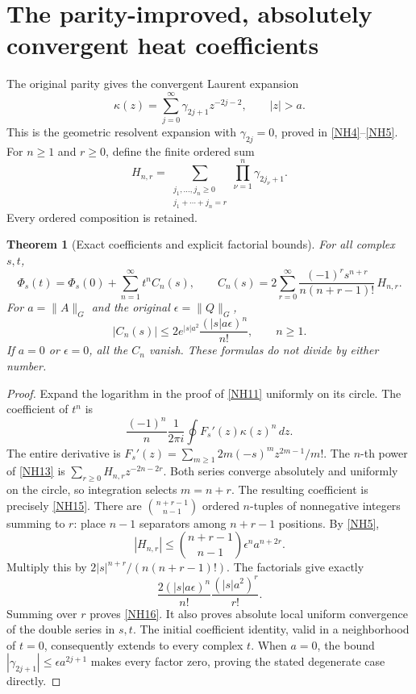 \documentclass[11pt]{article}
\newcommand{\eps}{\epsilon}\newcommand{\spec}{\operatorname{spec}}
\newtheorem{theorem}{Theorem}[section]
\begin{document}
\section{The parity-improved, absolutely convergent heat coefficients}

The original parity gives the convergent Laurent expansion
\begin{equation}\tag{NH13}\label{NH13}
\kappa(z)=\sum_{j=0}^\infty
\gamma_{2j+1}z^{-2j-2},\qquad |z|>a .
\end{equation}
This is the geometric resolvent expansion with
\(\gamma_{2j}=0\), proved in \eqref{NH4}--\eqref{NH5}.
For \(n\ge1\) and \(r\ge0\), define the finite ordered sum
\begin{equation}\tag{NH14}\label{NH14}
H_{n,r}=
\sum_{\substack{j_1,\ldots,j_n\ge0\\j_1+\cdots+j_n=r}}
\prod_{\nu=1}^n\gamma_{2j_\nu+1}.
\end{equation}
Every ordered composition is retained.

\begin{theorem}[Exact coefficients and explicit factorial bounds]
For all complex \(s,t\),
\begin{equation}\tag{NH15}\label{NH15}
\Phi_s(t)=\Phi_s(0)+\sum_{n=1}^\infty t^n C_n(s),\qquad
C_n(s)=2\sum_{r=0}^\infty
\frac{(-1)^r s^{n+r}}{n(n+r-1)!}\,H_{n,r}.
\end{equation}
For \(a=\|A\|_G\) and the original \(\eps=\|Q\|_G\),
\begin{equation}\tag{NH16}\label{NH16}
|C_n(s)|\le
2e^{|s|a^2}\frac{(|s|a\eps)^n}{n!},\qquad n\ge1.
\end{equation}
If \(a=0\) or \(\eps=0\), all the \(C_n\) vanish.
These formulas do not divide by either number.
\end{theorem}
\begin{proof}
Expand the logarithm in the proof of \eqref{NH11}
uniformly on its circle. The coefficient of \(t^n\) is
\[
\frac{(-1)^n}{n}\frac1{2\pi i}
\oint F_s'(z)\kappa(z)^n\,dz .
\]
The entire derivative is
\(F_s'(z)=\sum_{m\ge1}2m(-s)^m z^{2m-1}/m!\).
The \(n\)-th power of \eqref{NH13} is
\(\sum_{r\ge0}H_{n,r}z^{-2n-2r}\).
Both series converge absolutely and uniformly on the
circle, so integration selects \(m=n+r\).
The resulting coefficient is precisely \eqref{NH15}.
There are \(\binom{n+r-1}{n-1}\) ordered \(n\)-tuples
of nonnegative integers summing to \(r\): place \(n-1\)
separators among \(n+r-1\) positions. By \eqref{NH5},
\[
|H_{n,r}|\le
\binom{n+r-1}{n-1}\eps^n a^{n+2r}.
\]
Multiply this by \(2|s|^{n+r}/(n(n+r-1)!)\).
The factorials give exactly
\[
\frac{2(|s|a\eps)^n}{n!}\frac{(|s|a^2)^r}{r!}.
\]
Summing over \(r\) proves \eqref{NH16}.
It also proves absolute local uniform convergence of the
double series in \(s,t\). The initial coefficient identity,
valid in a neighborhood of \(t=0\), consequently extends
to every complex \(t\). When \(a=0\), the bound
\(|\gamma_{2j+1}|\le\eps a^{2j+1}\) makes every factor
zero, proving the stated degenerate case directly.
\end{proof}
\end{document}
